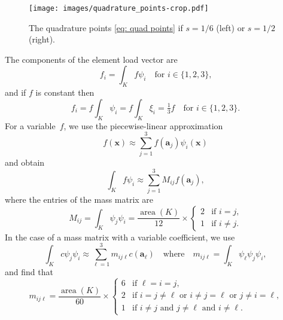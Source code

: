 \documentclass[a4paper,12pt]{article}
\newcommand{\bs}[1]{\boldsymbol{#1}}
\newcommand{\area}{\operatorname{area}}
\begin{document}
\begin{figure}
\caption{The quadrature points \eqref{eq: quad points} if $s=1/6$ (left) or
$s=1/2$ (right).}\label{fig: quad points}
\begin{center}
\texttt{[image: images/quadrature\_points-crop.pdf]}
\end{center}
\end{figure}

The components of the element load vector are
\[
f_i=\int_Kf\psi_i\quad\text{for $i\in\{1,2,3\}$,}
\]
and if $f$ is constant then
\[
f_i=f\int_K\psi_i=f\int_K\xi_i=\tfrac13f\quad\text{for $i\in\{1,2,3\}$.}
\]
For a variable~$f$, we use the piecewise-linear approximation
\[
f(\bs{x})\approx\sum_{j=1}^3f(\bs{a}_j)\psi_i(\bs{x})
\]
and obtain
\[
\int_Kf\psi_i\approx\sum_{j=1}^3M_{ij}f(\bs{a}_j),
\]
where the entries of the mass matrix are
\begin{equation}\label{eq: Mij const}
M_{ij}=\int_K\psi_j\psi_i=\frac{\area(K)}{12}\times\begin{cases}
    2&\text{if $i=j$,}\\
    1&\text{if $i\ne j$.}
\end{cases}
\end{equation}
In the case of a mass matrix with a variable coefficient, we use
\begin{equation}\label{eq: Mij variable}
\int_Kc\psi_j\psi_i\approx\sum_{\ell=1}^3m_{ij\ell} c(\bs{a}_\ell)
    \quad\text{where}\quad m_{ij\ell}=\int_K\psi_\ell\psi_j\psi_i,
\end{equation}
and find that
\[
m_{ij\ell}=\frac{\area(K)}{60}\times\begin{cases}
    6&\text{if $\ell=i=j$,}\\
    2&\text{if $i=j\ne\ell$ or $i\ne j=\ell$ or $j\ne i=\ell$,}\\
    1&\text{if $i\ne j$ and $j\ne\ell$ and $i\ne\ell$.}
\end{cases}
\]
\end{document}
